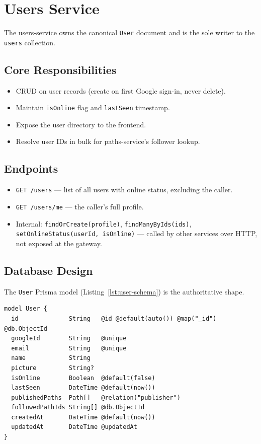 \documentclass[11pt,a4paper]{article}
\begin{document}
\section{Users Service}

The users-service owns the canonical \texttt{User} document and is the
sole writer to the \texttt{users} collection.

\subsection{Core Responsibilities}
\begin{itemize}[leftmargin=*]
  \item CRUD on user records (create on first Google sign-in, never
        delete).
  \item Maintain \texttt{isOnline} flag and \texttt{lastSeen}
        timestamp.
  \item Expose the user directory to the frontend.
  \item Resolve user IDs in bulk for paths-service's follower lookup.
\end{itemize}

\subsection{Endpoints}
\begin{itemize}[leftmargin=*]
  \item \texttt{GET /users} — list of all users with online status,
        excluding the caller.
  \item \texttt{GET /users/me} — the caller's full profile.
  \item Internal: \texttt{findOrCreate(profile)},
        \texttt{findManyByIds(ids)},
        \texttt{setOnlineStatus(userId, isOnline)} — called by other
        services over HTTP, not exposed at the gateway.
\end{itemize}

\subsection{Database Design}
The \texttt{User} Prisma model (Listing~\ref{lst:user-schema}) is the
authoritative shape.

\begin{lstlisting}[caption={Users-service Prisma model.},label={lst:user-schema}]
model User {
  id              String   @id @default(auto()) @map("_id") @db.ObjectId
  googleId        String   @unique
  email           String   @unique
  name            String
  picture         String?
  isOnline        Boolean  @default(false)
  lastSeen        DateTime @default(now())
  publishedPaths  Path[]   @relation("publisher")
  followedPathIds String[] @db.ObjectId
  createdAt       DateTime @default(now())
  updatedAt       DateTime @updatedAt
}
\end{lstlisting}
\end{document}
